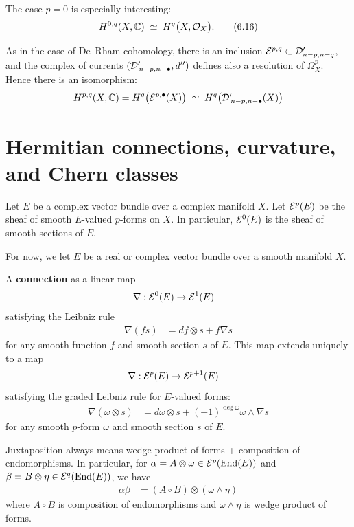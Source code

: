 \documentclass[12pt]{article}
\begin{document}
The case $p=0$ is especially interesting:
\begin{equation}
  H^{0,q}(X,\mathbb{C}) \;\simeq\; H^q\bigl(X,{\mathcal{O}}_X\bigr).
  \tag{6.16}
\end{equation}

As in the case of De~Rham cohomology, there is an inclusion
${\mathcal{E}}^{p,q}\subset {\mathcal{D}}'_{n-p,n-q}$, and the complex of currents
$({\mathcal{D}}'_{\,n-p,n-\bullet},d'')$ defines also a resolution of $\Omega_X^p$.
Hence there is an isomorphism:
\begin{equation}
  H^{p,q}(X,\mathbb{C})
  = H^q\bigl({\mathcal{E}}^{p,\bullet}(X)\bigr)
  \;\simeq\;
  H^q\bigl({\mathcal{D}}'_{\,n-p,n-\bullet}(X)\bigr)
\end{equation}


\section{Hermitian connections, curvature, and Chern classes}
Let $E$ be a complex vector bundle over a complex manifold $X$. Let ${\mathcal{E}}^p(E)$ be the sheaf of smooth $E$-valued $p$-forms on $X$. In particular, ${\mathcal{E}}^0(E)$ is the sheaf of smooth sections of $E$.

For now, we let $E$ be a real or complex vector bundle over a smooth manifold $X$. 
\begin{definition}
A \textbf{connection} as a linear map \begin{align*}
    \nabla: {\mathcal{E}}^0(E) & \to {\mathcal{E}}^1(E)
\end{align*} satisfying the Leibniz rule \begin{align*}
    \nabla(f s) & = df \otimes s + f \nabla s
\end{align*} for any smooth function $f$ and smooth section $s$ of $E$. This map extends uniquely to a map \begin{align*}
    \nabla: {\mathcal{E}}^p(E) & \to {\mathcal{E}}^{p+1}(E)
\end{align*} satisfying the graded Leibniz rule for $E$-valued forms:
\begin{align*}
    \nabla(\omega \otimes s) & = d\omega \otimes s + (-1)^{\deg \omega} \omega \wedge \nabla s
\end{align*} for any smooth $p$-form $\omega$ and smooth section $s$ of $E$.
\end{definition}

\begin{remark}
    [Notation] Juxtaposition always means wedge product of forms + composition of endomorphisms. In particular, for $\alpha = A \otimes \omega \in {\mathcal{E}}^p(\operatorname{End}(E))$ and $\beta = B \otimes \eta \in {\mathcal{E}}^q(\operatorname{End}(E))$, we have \begin{align*}
        \alpha \beta & = (A \circ B) \otimes (\omega \wedge \eta)
    \end{align*} where $A \circ B$ is composition of endomorphisms and $\omega \wedge \eta$ is wedge product of forms.
\end{remark}
\end{document}
